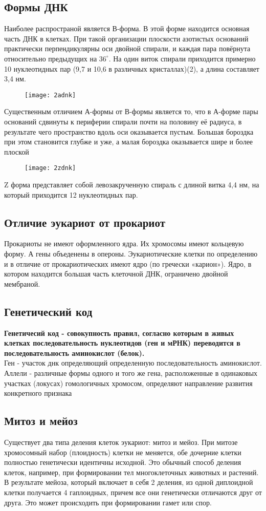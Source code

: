 \subsection{Формы ДНК}
Наиболее распространой является В-форма. В этой форме находится основная часть ДНК в клетках. При такой организации плоскости азотистых оснований практически перпендикулярны оси двойной спирали, и каждая пара повёрнута относительно предыдущих на $36^\circ$. На один виток спирали приходится примерно 10 нуклеотидных пар (9,7 и 10,6 в различных кристаллах)(2), а длина составляет 3,4 нм.
\begin{figure}[H]
	\centering
	\texttt{[image: 2adnk]}
\end{figure}
Существенным отличием А-формы от В-формы является то, что в А-форме пары оснований сдвинуты к периферии спирали почти на половину её радиуса, в результате чего пространство вдоль оси оказывается пустым. Большая бороздка при этом становится глубже и уже, а малая бороздка оказывается шире и более плоской
\begin{figure}[H]
	\texttt{[image: 2zdnk]}
\end{figure} 
Z форма представляет собой левозакрученную спираль с длиной витка 4,4 нм, на который приходится 12 нуклеотидных пар.
\subsection{Отличие эукариот от прокариот}
Прокариоты не имеют оформленного ядра. Их хромосомы имеют кольцевую форму. А гены объеденены в опероны.
Эукариотические клетки по определению и в отличие от прокариотических имеют ядро (по гречески «карион»). Ядро, в котором
находится большая часть клеточной ДНК, ограничено двойной мембраной. 

\subsection{Генетический код}
\textbf{Генетичесий код - совокупность правил, согласно которым в живых клетках последовательность нуклеотидов (ген и мРНК) переводится в последовательность аминокислот (белок).}\\
Ген - участок днк определяющий определенную последовательность аминокислот.\\
Аллели - различные формы одного и того же гена, расположенные в одинаковых участках (локусах) гомологичных хромосом, определяют направление развития конкретного признака

\subsection{Митоз и мейоз}
Существует два типа деления клеток эукариот: митоз и мейоз. При митозе хромосомный набор (плоидность) клетки не меняется, обе дочерние клетки полностью генетически идентичны исходной. Это обычный способ деления клеток, например, при формировании тел многоклеточных животных и растений. В результате мейоза, который включает в себя 2 деления, из одной диплоидной клетки получается 4 гаплоидных, причем все они генетически отличаются друг от друга. Это может происходить при формировании гамет или спор.\\

